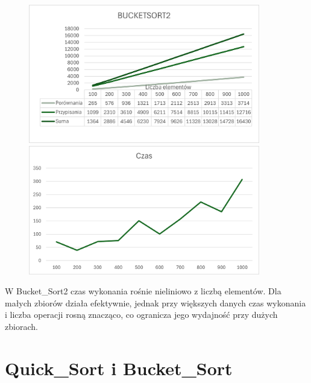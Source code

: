 \documentclass{article}
\begin{document}
			\begin{figure}[H]
				\centering
				\includegraphics[width=0.9\textwidth]{BS21.png}
				\includegraphics[width=0.9\textwidth]{BS22.png}
			\end{figure}
			
			W Bucket\_Sort2 czas wykonania rośnie nieliniowo z liczbą elementów. Dla małych zbiorów działa efektywnie, jednak przy większych danych czas wykonania i liczba operacji rosną znacząco, co ogranicza jego wydajność przy dużych zbiorach.
			
			\section*{Quick\_Sort i Bucket\_Sort}
			
\end{document}
